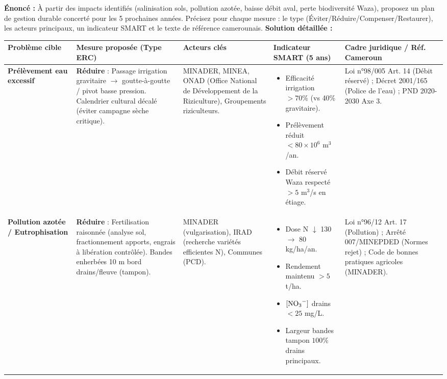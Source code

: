 \documentclass[11pt]{article}
\begin{document}
\begin{exoresolu}
    \textbf{Énoncé :} À partir des impacts identifiés (salinisation sols, pollution azotée, baisse débit aval, perte biodiversité Waza), proposez un plan de gestion durable concerté pour les 5 prochaines années. Précisez pour chaque mesure : le type (Éviter/Réduire/Compenser/Restaurer), les acteurs principaux, un indicateur SMART et le texte de référence camerounais.
    \tcblower
    \textbf{Solution détaillée :}
    \begin{center}
        \begin{tabularx}{\linewidth}{|l|X|l|X|l|}\hline
        \rowcolor{popblueL}
        \textbf{Problème cible} & \textbf{Mesure proposée (Type ERC)} & \textbf{Acteurs clés} & \textbf{Indicateur SMART (5 ans)} & \textbf{Cadre juridique / Réf. Cameroun} \\ \hline
        \textbf{Prélèvement eau excessif} & \textbf{Réduire} : Passage irrigation gravitaire $\rightarrow$ goutte-à-goutte / pivot basse pression. Calendrier cultural décalé (éviter campagne sèche critique). & MINADER, MINEA, ONAD (Office National de Développement de la Riziculture), Groupements riziculteurs. & \begin{itemize}\item Efficacité irrigation $> 70\%$ (vs 40\% gravitaire).\item Prélèvement réduit $< 80 \times 10^6$ m$^3$/an.\item Débit réservé Waza respecté $> 5$ m$^3$/s en étiage.\end{itemize} & Loi n°98/005 Art. 14 (Débit réservé) ; Décret 2001/165 (Police de l'eau) ; PND 2020-2030 Axe 3. \\ \hline
        \textbf{Pollution azotée / Eutrophisation} & \textbf{Réduire} : Fertilisation raisonnée (analyse sol, fractionnement apports, engrais à libération contrôlée). Bandes enherbées 10 m bord drains/fleuve (tampon). & MINADER (vulgarisation), IRAD (recherche variétés efficientes N), Communes (PCD). & \begin{itemize}\item Dose N $\downarrow$ 130 $\rightarrow$ 80 kg/ha/an.\item Rendement maintenu $> 5$ t/ha.\item $[\ce{NO3-}]$ drains $< 25$ mg/L.\item Largeur bandes tampon $100\%$ drains principaux.\end{itemize} & Loi n°96/12 Art. 17 (Pollution) ; Arrêté 007/MINEPDED (Normes rejet) ; Code de bonnes pratiques agricoles (MINADER). \\ \hline

\end{tabularx}
\end{center}
\end{exoresolu}
\end{document}
